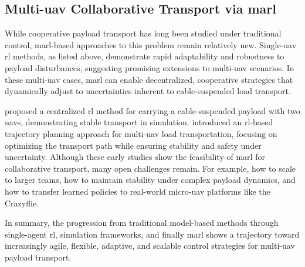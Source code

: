 \subsection{Multi-\gls{uav} Collaborative Transport via \gls{marl}}
While cooperative payload transport has long been studied under traditional control, \gls{marl}-based approaches to this problem remain relatively new. Single-\gls{uav} \gls{rl} methods, as listed above, demonstrate rapid adaptability and robustness to payload disturbances, suggesting promising extensions to multi-\gls{uav} scenarios. In these multi-\gls{uav} cases, \gls{marl} can enable decentralized, cooperative strategies that dynamically adjust to uncertainties inherent to cable-suspended load transport. 

\cite{Lin2024PayloadTW} proposed a centralized \gls{rl} method for carrying a cable-suspended payload with two \gls{uav}s, demonstrating stable transport in simulation. \cite{Estevez2024Reinforcement} introduced an \gls{rl}-based trajectory planning approach for multi-\gls{uav} load transportation, focusing on optimizing the transport path while ensuring stability and safety under uncertainty. Although these early studies show the feasibility of \gls{marl} for collaborative transport, many open challenges remain. For example, how to scale to larger teams, how to maintain stability under complex payload dynamics, and how to transfer learned policies to real-world micro-\gls{uav} platforms like the Crazyflie.

In summary, the progression from traditional model-based methods through single-agent \gls{rl}, simulation frameworks, and finally \gls{marl} shows a trajectory toward increasingly agile, flexible, adaptive, and scalable control strategies for multi-\gls{uav} payload transport.